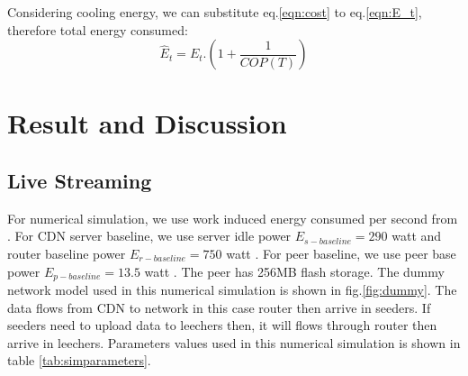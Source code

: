 \documentclass[JIP]{ipsj}
\begin{document}
Considering cooling energy, we can substitute eq.\ref{eqn:cost} to eq.\ref{eqn:E_t}, therefore total energy consumed: 
\begin{equation}
	\hat{E}_{t} = E_{t}.\left( 1+\frac{1}{COP(T)} \right)
\end{equation}




\section{Result and Discussion}\label{analysis}
\subsection{Live Streaming}
For numerical simulation, we use work induced energy consumed per second from \cite{Nedevschi:2008:HDC:1855610.1855618}.
For CDN server baseline, we use server idle power $E_{s-baseline}=290$ watt and router baseline power $E_{r-baseline}=750$ watt \cite{Nedevschi:2008:HDC:1855610.1855618}. 
For peer baseline, we use peer base power $E_{p-baseline}=13.5$ watt \cite{valancius2009greening}.
The peer has 256MB flash storage.
The dummy network model used in this numerical simulation is shown in fig.\ref{fig:dummy}.
The data flows from CDN to network in this case router then arrive in seeders. 
If seeders need to upload data to leechers then, it will flows through router then arrive in leechers. 
Parameters values used in this numerical simulation is shown in table \ref{tab:simparameters}.
\end{document}
